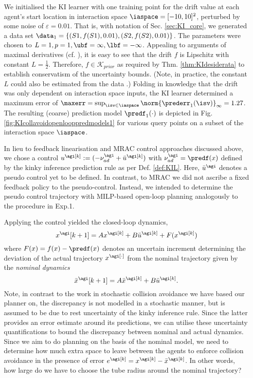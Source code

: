 We initialised the KI learner with one training point for the drift value at each agent's start location in interaction space $\iaspace = [-10,10]^2$, perturbed by some noise of $\varepsilon = 0.01$. That is, with notation of Sec. \ref{sec:KI_core}, we generated
 a data set $\data_1 = \{ (S1, f(S1), 0.01), (S2, f(S2), 0.01)  \}$. The parameters were chosen to $L=1,p=1,\ubf = \infty, \lbf = -\infty$. Appealing to arguments of maximal derivatives (cf. \cite{Weaver1999}), it is easy to see that the drift $f$ is Lipschitz with constant $L=\frac 1 2$. Therefore, $f \in \mathcal K_{prior}$ as required by Thm. \ref{thm:KIdesiderata} to establish conservatism of the uncertainty bounds. 
(Note, in practice, the constant $L$ could also be estimated from the data \cite{anonymous,Wood1996}.) Folding in knowledge that the drift was only dependent on interaction space inputs, the KI learner determined a maximum error of $\maxerr = \sup_{\isv \in \iaspace} \norm{\prederr_1(\isv)}_{\infty } = 1.27$. The resulting (coarse) prediction model $\predf_1(\cdot)$ is depicted in Fig. \ref{fig:KIcollavoidopenlooppredmodels1} for various query points on a subset of the interaction space $\iaspace$.
 

In lieu to feedback linearisation and MRAC control approaches \cite{chowdharyacc2013} discussed above, we chose a control $u^\agi[k]:= (- \nu^\agi_{ad} + \bar u^\agi[k]  ) $ with $\nu^\agi_{ad} =  \predf(x)$ defined by the kinky inference prediction rule as per Def. \ref{def:KIL}. Here, $\bar u^\agi$ denotes a pseudo control yet to be defined. In contrast, to MRAC \cite{chowdharyacc2013} we did not ascribe a fixed feedback policy to the pseudo-control. Instead, we intended to determine the pseudo control trajectory with MILP-based open-loop planning analogously to the procedure in Exp.1.

Applying the control yielded the closed-loop dynamics,
\begin{equation}
	x^\agi[{k+1}] = A x^\agi[k] + B \bar u^\agi[k] + F(x^\agi[k])
\end{equation}
 where $F(x) = f(x) - \predf(x) $ denotes an uncertain increment determining the deviation of the actual trajectory $x^\agi [\cdot]$ from the nominal trajectory 
given by the \textit{nominal dynamics}
\begin{equation}
	\bar x^\agi[{k+1}] = A \bar x^\agi[k] + B \bar u^\agi[k].
\end{equation}
%
Note, in contrast to the work in stochastic collision avoidance \cite{LyonsACC2012} we have based our planner on, the discrepancy is not modelled in a stochastic manner, but is assumed to be due to rest uncertainty of the kinky inference rule. 
Since the latter provides an error estimate around its predictions, we can utilise these uncertainty quantifications to bound the discrepancy between nominal and actual dynamics.
Since we aim to do planning on the basis of the nominal model, we need to determine how much extra space to leave between the agents to enforce collision avoidance in the presence of error $e^\agi[k] = x^\agi[k] - \bar x^\agi[k]$. 
In other words, how large do we have to choose the tube radius around the nominal trajectory?

